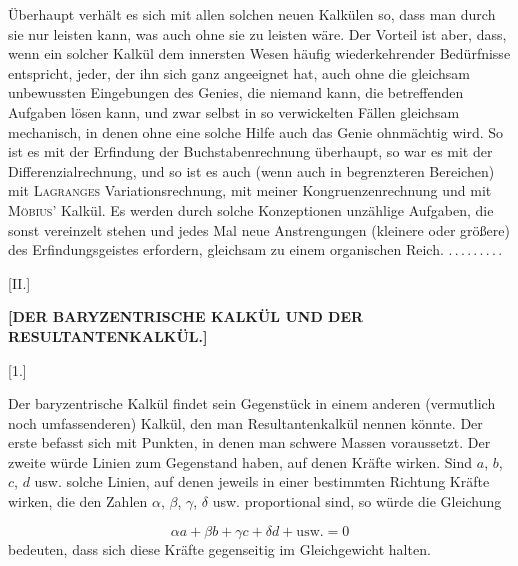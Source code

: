 \par{}
\indent Überhaupt verhält es sich mit allen solchen neuen Kalkülen so, dass man durch sie
nur leisten kann, was auch ohne sie zu leisten wäre. Der Vorteil ist aber,
dass, wenn ein solcher Kalkül dem innersten Wesen häufig wiederkehrender
Bedürfnisse entspricht, jeder, der ihn sich ganz angeeignet hat, auch ohne die
gleichsam unbewussten Eingebungen des Genies, die niemand  kann, die betreffenden
Aufgaben lösen kann, und zwar selbst in so verwickelten Fällen gleichsam mechanisch,
in denen ohne eine solche Hilfe auch das Genie ohnmächtig wird. So ist es mit
der Erfindung der Buchstabenrechnung überhaupt, so war es mit der Differenzialrechnung,
und so ist es auch (wenn auch in begrenzteren Bereichen) mit \textsc{Lagranges}
Variationsrechnung, mit meiner Kongruenzenrechnung und mit \textsc{Möbius}' Kalkül. Es
werden durch solche Konzeptionen unzählige Aufgaben, die sonst vereinzelt stehen und
jedes Mal neue Anstrengungen (kleinere oder größere) des Erfindungsgeistes erfordern,
gleichsam zu einem organischen Reich. \mbox{.\,.\,.\,.\,.\,.\,.\,.\,.}

\begin{center}
\medskip

[II.]

\textbf{[DER BARYZENTRISCHE KALKÜL UND DER RESULTANTENKALKÜL.]}

[1.]
\end{center}

Der baryzentrische Kalkül findet sein Gegenstück in einem anderen (vermutlich noch
umfassenderen) Kalkül, den man Resultantenkalkül nennen könnte. Der erste befasst
sich mit Punkten, in denen man schwere Massen voraussetzt. Der zweite würde
Linien zum Gegenstand haben, auf denen Kräfte wirken. Sind $a$, $b$, $c$,
$d$ usw. solche Linien, auf denen jeweils in einer bestimmten Richtung Kräfte wirken, die
den Zahlen $\alpha$, $\beta$, $\gamma$, $\delta$ usw. proportional sind, so würde
die Gleichung

\[
\alpha a + \beta b + \gamma c + \delta d + \text{usw.} = 0
\]
\noindent bedeuten, dass sich diese Kräfte gegenseitig im Gleichgewicht halten.

